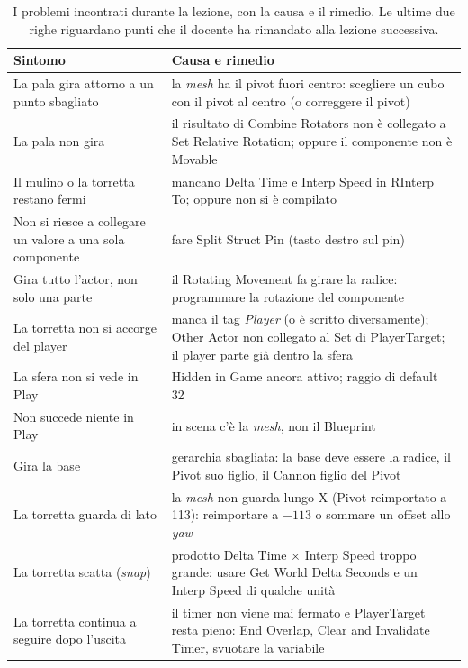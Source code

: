 \begin{table}[htbp]
\centering
\small
\begin{tabular}{@{}p{5.4cm}p{8.6cm}@{}}
\toprule
\textbf{Sintomo} & \textbf{Causa e rimedio} \\
\midrule
La pala gira attorno a un punto sbagliato & la \emph{mesh} ha il pivot fuori
centro: scegliere un cubo con il pivot al centro (o correggere il pivot) \\
La pala non gira & il risultato di Combine Rotators non è collegato a Set
Relative Rotation; oppure il componente non è Movable \\
Il mulino o la torretta restano fermi & mancano Delta Time e Interp Speed in
RInterp To; oppure non si è compilato \\
Non si riesce a collegare un valore a una sola componente & fare Split Struct Pin
(tasto destro sul pin) \\
Gira tutto l'actor, non solo una parte & il Rotating Movement fa girare la radice:
programmare la rotazione del componente \\
La torretta non si accorge del player & manca il tag \emph{Player} (o è scritto
diversamente); Other Actor non collegato al Set di PlayerTarget; il player parte già
dentro la sfera \\
La sfera non si vede in Play & Hidden in Game ancora attivo; raggio di default 32 \\
Non succede niente in Play & in scena c'è la \emph{mesh}, non il Blueprint \\
Gira la base & gerarchia sbagliata: la base deve essere la radice, il Pivot suo
figlio, il Cannon figlio del Pivot \\
La torretta guarda di lato & la \emph{mesh} non guarda lungo X (Pivot reimportato
a 113): reimportare a $-113$ o sommare un offset allo \emph{yaw} \\
La torretta scatta (\emph{snap}) & prodotto Delta Time $\times$ Interp Speed troppo
grande: usare Get World Delta Seconds e un Interp Speed di qualche unità \\
La torretta continua a seguire dopo l'uscita & il timer non viene mai fermato e
PlayerTarget resta pieno: End Overlap, Clear and Invalidate Timer, svuotare la
variabile \\
\bottomrule
\end{tabular}
\caption{I problemi incontrati durante la lezione, con la causa e il rimedio. Le ultime
due righe riguardano punti che il docente ha rimandato alla lezione successiva.}
\label{ue4:tab:errori}
\end{table}

